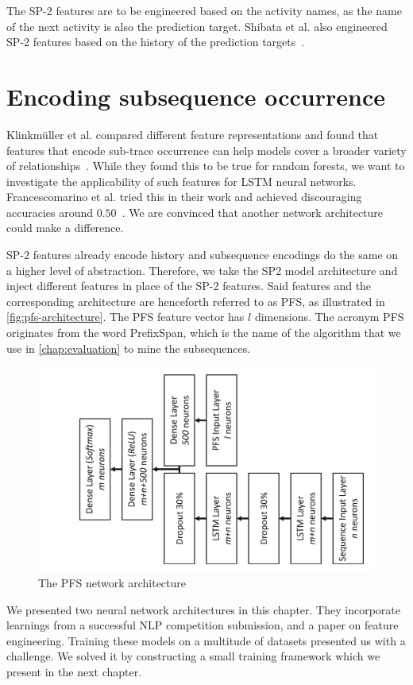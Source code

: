 \noindent The SP-2 features are to be engineered based on the activity names, as the name of the next activity is also the prediction target.
Shibata et al. also engineered SP-2 features based on the history of the prediction targets~\cite{shibata2016bipartite}.

\section{Encoding subsequence occurrence}\label{sec:contrib:pfs-inspiration}
Klinkmüller et al. compared different feature representations and found that features that encode sub-trace occurrence can help models cover a broader variety of relationships~\cite{klinkmuller2018reliablemonitoring}.
While they found this to be true for random forests, we want to investigate the applicability of such features for LSTM neural networks.
Francescomarino et al. tried this in their work and achieved discouraging accuracies around $0.50$~\cite{francescomarino2017}.
We are convinced that another network architecture could make a difference.

SP-2 features already encode history and subsequence encodings do the same on a higher level of abstraction.
Therefore, we take the SP2 model architecture and inject different features in place of the SP-2 features.
Said features and the corresponding architecture are henceforth referred to as PFS, as illustrated in \autoref{fig:pfs-architecture}. The PFS feature vector has $l$ dimensions.
The acronym PFS originates from the word PrefixSpan, which is the name of the algorithm that we use in \autoref{chap:evaluation} to mine the subsequences.

\begin{figure}[ht]
    \centering
    \includegraphics[width=.8\textwidth,angle=-90,origin=c]{gfx/pfs-network-architecture.pdf}
    \caption{The PFS network architecture}
    \label{fig:pfs-architecture}
\end{figure}

We presented two neural network architectures in this chapter. They incorporate
learnings from a successful NLP competition submission, and a paper on feature engineering.
Training these models on a multitude of datasets presented us with a challenge.
We solved it by constructing a small training framework which we present in the next chapter.
